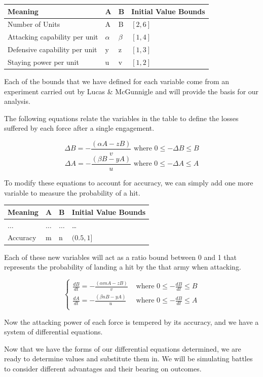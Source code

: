 \begin{longtable}[]{@{}llll@{}}
\toprule
Meaning & A & B & Initial Value Bounds\tabularnewline
\midrule
\endhead
Number of Units & A & B & \([2, 6]\)\tabularnewline
Attacking capability per unit & \(\alpha\) & \(\beta\) &
\([1,4]\)\tabularnewline
Defensive capability per unit & y & z & \([1,3]\)\tabularnewline
Staying power per unit & u & v & \([1,2]\)\tabularnewline
\bottomrule
\end{longtable}

Each of the bounds that we have defined for each variable come from an
experiment carried out by Lucas \& McGunnigle and will provide the basis
for our analysis.

The following equations relate the variables in the table to define the
losses suffered by each force after a single engagement.

\[\Delta B = -\frac{(\alpha A - z B)}{v} \text{ where } 0 \leq -\Delta B \leq B\]
\[\Delta A = -\frac{(\beta B - y A)}{u} \text{ where } 0 \leq -\Delta A \leq A\]

To modify these equations to account for accuracy, we can simply add one
more variable to measure the probability of a hit.

\begin{longtable}[]{@{}llll@{}}
\toprule
Meaning & A & B & Initial Value Bounds\tabularnewline
\midrule
\endhead
\(\ldots\) & \(\ldots\) & \(\ldots\) & \ldots{}\tabularnewline
Accuracy & m & n & \((0.5, 1]\)\tabularnewline
\bottomrule
\end{longtable}

Each of these new variables will act as a ratio bound between 0 and 1
that represents the probability of landing a hit by the that army when
attacking.

\[
\begin{cases}
\frac{dB}{dt} = -\frac{(\alpha m A - z B)}{v} & \text{ where } 0 \leq -\frac{dB}{dt} \leq B \\
\frac{dA}{dt} = -\frac{(\beta n B - y A)}{u} & \text{ where } 0 \leq -\frac{dB}{dt} \leq A \\
\end{cases}
\]

Now the attacking power of each force is tempered by its accuracy, and
we have a system of differential equations.

Now that we have the forms of our differential equations determined, we
are ready to determine values and substitute them in. We will be
simulating battles to consider different advantages and their bearing on
outcomes.

